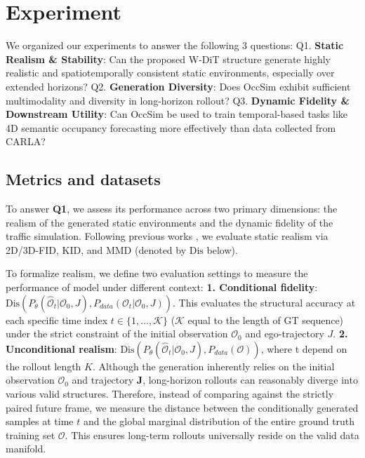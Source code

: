 \section{Experiment}

We organized our experiments to answer the following 3 questions: Q1. \textbf{Static Realism \& Stability}: Can the proposed W-DiT structure generate highly realistic and spatiotemporally consistent static environments, especially over extended horizons? Q2. \textbf{Generation Diversity}: Does OccSim exhibit sufficient multimodality and diversity in long-horizon rollout? Q3. \textbf{Dynamic Fidelity \& Downstream Utility}: Can OccSim be used to train temporal-based tasks like 4D semantic occupancy forecasting more effectively than data collected from CARLA?


\subsection{Metrics and datasets}
\label{sec:metrics}

To answer \textbf{Q1}, we assess its performance across two primary dimensions: the realism of the generated static environments and the dynamic fidelity of the traffic simulation. Following previous works \cite{bian2024dynamiccity, yang2025x}, we evaluate static realism via 2D/3D-FID, KID, and MMD (denoted by $\textrm{Dis}$ below).

To formalize realism, we define two evaluation settings to measure the performance of model under different context: \textbf{1. Conditional fidelity}: ${\textrm{Dis}\left( P_{\theta}(\hat{\mathcal{O}}_t | \mathcal{O}_0, J), P_{data}(\mathcal{O}_t | \mathcal{O}_0, J) \right)}$. This evaluates the structural accuracy at each specific time index $t \in \{1, \dots, \mathcal{K}\}$ ($\mathcal{K}$ equal to the length of GT sequence) under the strict constraint of the initial observation $\mathcal{O}_0$ and ego-trajectory $J$. \textbf{2. Unconditional realism}: $\textrm{Dis}\left( P_{\theta}(\hat{\mathcal{O}}_t | \mathcal{O}_0, J), P_{data}(\mathcal{O}) \right)$, where t depend on the rollout length $K$. Although the generation inherently relies on the initial observation $\mathcal{O}_0$ and trajectory $\mathbf{J}$, long-horizon rollouts can reasonably diverge into various valid structures. Therefore, instead of comparing against the strictly paired future frame, we measure the distance between the conditionally generated samples at time $t$ and the global marginal distribution of the entire ground truth training set $\mathcal{O}$. This ensures long-term rollouts universally reside on the valid data manifold.

